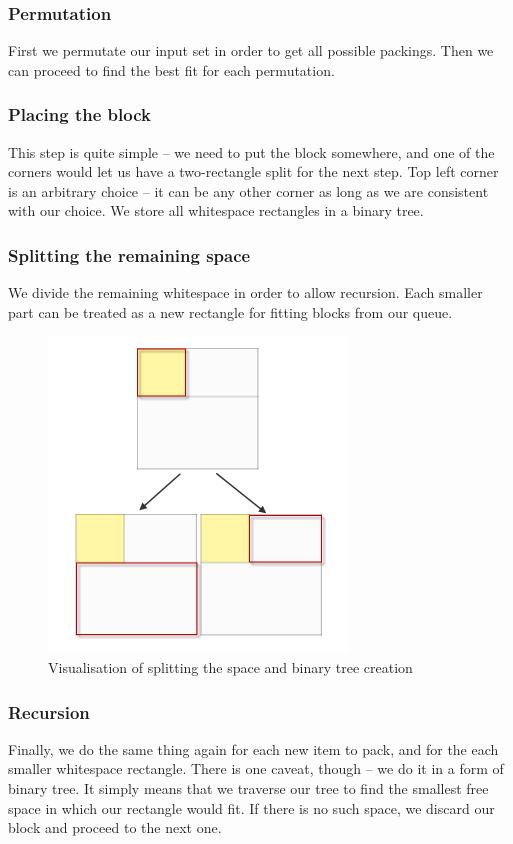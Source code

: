 \subsubsection{Permutation}
First we permutate our input set in order to get all possible packings.
Then we can proceed to find the best fit for each permutation.

\subsubsection{Placing the block}
This step is quite simple -- we need to put the block somewhere,
and one of the corners would let us have a two-rectangle split for the next step.
Top left corner is an arbitrary choice -- it can be any other corner as long
as we are consistent with our choice.
We store all whitespace rectangles in a binary tree.

\subsubsection{Splitting the remaining space}
We divide the remaining whitespace in order to allow recursion.
Each smaller part can be treated as a new rectangle
for fitting blocks from our queue.
\begin{figure}[H]
  \centering
	\includegraphics[width=.5\textwidth]{split}
  \caption{Visualisation of splitting the space and binary tree creation}
  \label{fig:split}
\end{figure}

\subsubsection{Recursion}
Finally, we do the same thing again for each new item to pack,
and for the each smaller whitespace rectangle.
There is one caveat, though -- we do it in a form of binary tree.
It simply means that we traverse our tree to find the smallest free space
in which our rectangle would fit.
If there is no such space, we discard our block and proceed to the next one.

